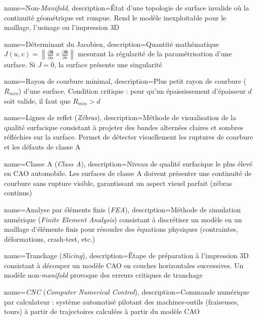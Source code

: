{
    name=Non-\textit{Manifold},
    description={État d'une topologie de surface invalide où la continuité géométrique est rompue. Rend le modèle inexploitable pour le maillage, l'usinage ou l'impression 3D}
}

{
    name=Déterminant du Jacobien,
    description={Quantité mathématique $J(u,v) = \left\| \frac{\partial \mathbf{S}}{\partial u} \times \frac{\partial \mathbf{S}}{\partial v} \right\|$ mesurant la régularité de la paramétrisation d'une surface. Si $J = 0$, la surface présente une singularité}
}

{
    name=Rayon de courbure minimal,
    description={Plus petit rayon de courbure ($R_{min}$) d'une surface. Condition critique : pour qu'un épaississement d'épaisseur $d$ soit valide, il faut que $R_{min} > d$}
}

{
    name=Lignes de reflet (\textit{Zébras}),
    description={Méthode de visualisation de la qualité surfacique consistant à projeter des bandes alternées claires et sombres réfléchies sur la surface. Permet de détecter visuellement les ruptures de courbure et les défauts de classe A}
}

{
    name=Classe A (\textit{Class A}),
    description={Niveau de qualité surfacique le plus élevé en CAO automobile. Les surfaces de classe A doivent présenter une continuité de courbure sans rupture visible, garantissant un aspect visuel parfait (zébras continus)}
}

{
    name=Analyse par éléments finis (\textit{FEA}),
    description={Méthode de simulation numérique (\textit{Finite Element Analysis}) consistant à discrétiser un modèle en un maillage d'éléments finis pour résoudre des équations physiques (contraintes, déformations, crash-test, etc.)}
}

{
    name=Tranchage (\textit{Slicing}),
    description={Étape de préparation à l'impression 3D consistant à découper un modèle CAO en couches horizontales successives. Un modèle non-\textit{manifold} provoque des erreurs critiques de tranchage}
}

{
    name=\textit{CNC} (\textit{Computer Numerical Control}),
    description={Commande numérique par calculateur : système automatisé pilotant des machines-outils (fraiseuses, tours) à partir de trajectoires calculées à partir du modèle CAO}
}

